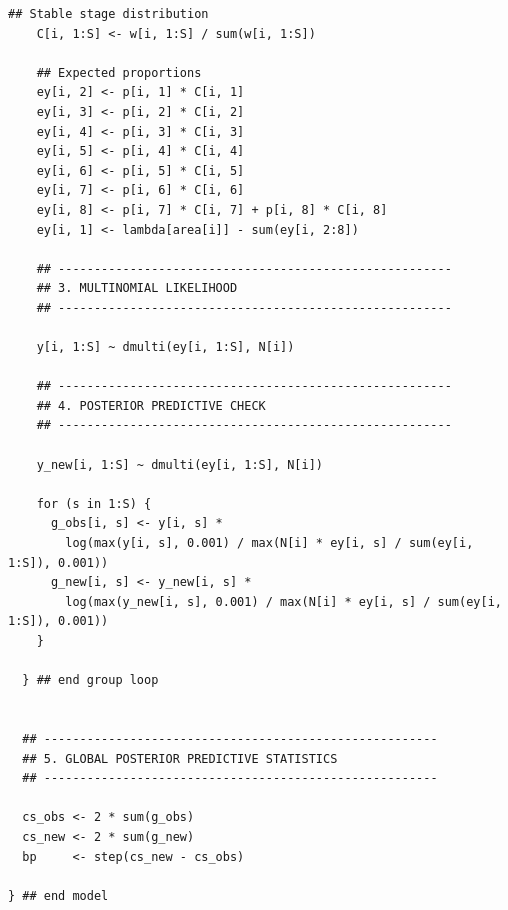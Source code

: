 \documentclass[12pt,a4paper,final,abstract=true,headings=small]{scrartcl}
\begin{document}
\begin{lstlisting}[language=JAGS]
    ## Stable stage distribution
    C[i, 1:S] <- w[i, 1:S] / sum(w[i, 1:S])

    ## Expected proportions
    ey[i, 2] <- p[i, 1] * C[i, 1]
    ey[i, 3] <- p[i, 2] * C[i, 2]
    ey[i, 4] <- p[i, 3] * C[i, 3]
    ey[i, 5] <- p[i, 4] * C[i, 4]
    ey[i, 6] <- p[i, 5] * C[i, 5]
    ey[i, 7] <- p[i, 6] * C[i, 6]
    ey[i, 8] <- p[i, 7] * C[i, 7] + p[i, 8] * C[i, 8]
    ey[i, 1] <- lambda[area[i]] - sum(ey[i, 2:8])

    ## -------------------------------------------------------
    ## 3. MULTINOMIAL LIKELIHOOD
    ## -------------------------------------------------------

    y[i, 1:S] ~ dmulti(ey[i, 1:S], N[i])

    ## -------------------------------------------------------
    ## 4. POSTERIOR PREDICTIVE CHECK
    ## -------------------------------------------------------

    y_new[i, 1:S] ~ dmulti(ey[i, 1:S], N[i])

    for (s in 1:S) {
      g_obs[i, s] <- y[i, s] *
        log(max(y[i, s], 0.001) / max(N[i] * ey[i, s] / sum(ey[i, 1:S]), 0.001))
      g_new[i, s] <- y_new[i, s] *
        log(max(y_new[i, s], 0.001) / max(N[i] * ey[i, s] / sum(ey[i, 1:S]), 0.001))
    }

  } ## end group loop


  ## -------------------------------------------------------
  ## 5. GLOBAL POSTERIOR PREDICTIVE STATISTICS
  ## -------------------------------------------------------

  cs_obs <- 2 * sum(g_obs)
  cs_new <- 2 * sum(g_new)
  bp     <- step(cs_new - cs_obs)

} ## end model

\end{lstlisting}
\end{document}
